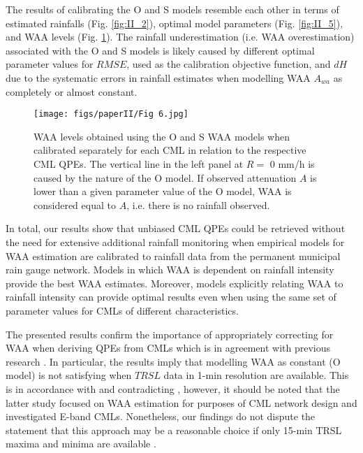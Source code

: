 \documentclass{ctuthesis}\usepackage[]{graphicx}\usepackage[]{color}
\begin{document}
The results of calibrating the O and S models resemble each other in terms of estimated rainfalls (Fig. \ref{fig:II_2}), optimal model parameters (Fig. \ref{fig:II_5}), and WAA levels (Fig. \ref{fig:II_6}). The rainfall underestimation (i.e. WAA overestimation) associated with the O and S models is likely caused by different optimal parameter values for $R\!M\!S\!E$, used as the calibration objective function, and $d\!H$ due to the systematic errors in rainfall estimates when modelling WAA $A_{wa}$ as completely or almost constant.

\begin{figure}[h]
\begin{center}
\texttt{[image: figs/paperII/Fig 6.jpg]}
\caption{WAA levels obtained using the O and S WAA models when calibrated separately for each CML in relation to the respective CML QPEs. The vertical line in the left panel at $R =$ 0 mm/h is caused by the nature of the O model. If observed attenuation $A$ is lower than a given parameter value of the O model, WAA is considered equal to $A$, i.e. there is no rainfall observed.} 
\label{fig:II_6}
\end{center}
\end{figure}

In total, our results show that unbiased CML QPEs could be retrieved without the need for extensive additional rainfall monitoring when empirical models for WAA estimation are calibrated to rainfall data from the permanent municipal rain gauge network. Models in which WAA is dependent on rainfall intensity provide the best WAA estimates. Moreover, models explicitly relating WAA to rainfall intensity can provide optimal results even when using the same set of parameter values for CMLs of different characteristics.

The presented results confirm the importance of appropriately correcting for WAA when deriving QPEs from CMLs which is in agreement with previous research \citep{chwalaCommercialMicrowaveLink2019}. In particular, the results imply that modelling WAA as constant (O model) is not satisfying when $T\!R\!S\!L$ data in 1-min resolution are available. This is in accordance with \cite{pastorekCommercialMicrowaveLinks2019, fenclQuantifyingWetAntenna2019} and contradicting \cite{ostrometzkyWetAntennaEffectFactor2018}, however, it should be noted that the latter study focused on WAA estimation for purposes of CML network design and investigated E-band CMLs. Nonetheless, our findings do not dispute the statement that this approach may be a reasonable choice if only 15-min TRSL maxima and minima are available \citep{chwalaCommercialMicrowaveLink2019}.
\end{document}
